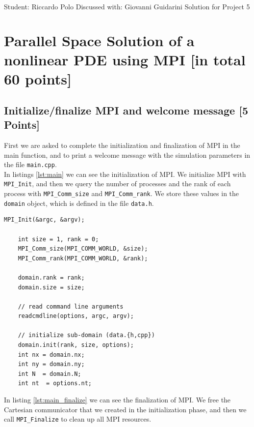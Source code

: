 \documentclass[unicode,10pt,a4paper,oneside,numbers=endperiod,openany]{scrartcl}
\begin{document}
\setassignment
{}

            {Student: Riccardo Polo}
            {Discussed with: Giovanni Guidarini}
            {Solution for Project 5}{}
\newline

\assignmentpolicy

\newpage
\section{Parallel Space Solution of a nonlinear PDE using MPI
         [in total 60 points]}

\subsection{Initialize/finalize MPI and welcome message [5 Points]}
First we are asked to complete the initialization and finalization of MPI in the main function, and to print a welcome message with the simulation parameters in the file \texttt{main.cpp}.\\
In listings \ref{lst:main} we can see the initialization of MPI. We initialize MPI with \texttt{MPI\_Init}, and then we query the number of processes and the rank of each process with \texttt{MPI\_Comm\_size} and \texttt{MPI\_Comm\_rank}. We store these values in the \texttt{domain} object, which is defined in the file \texttt{data.h}.
\begin{lstlisting}[style=grayverbatim,label={lst:main},caption={Initialization of MPI}]
    MPI_Init(&argc, &argv);

    int size = 1, rank = 0;
    MPI_Comm_size(MPI_COMM_WORLD, &size);
    MPI_Comm_rank(MPI_COMM_WORLD, &rank);

    domain.rank = rank;
    domain.size = size;

    // read command line arguments
    readcmdline(options, argc, argv);

    // initialize sub-domain (data.{h,cpp})
    domain.init(rank, size, options);
    int nx = domain.nx;
    int ny = domain.ny;
    int N  = domain.N;
    int nt  = options.nt;
\end{lstlisting}
In listing \ref{lst:main_finalize} we can see the finalization of MPI. We free the Cartesian communicator that we created in the initialization phase, and then we call \texttt{MPI\_Finalize} to clean up all MPI resources.
\end{document}
